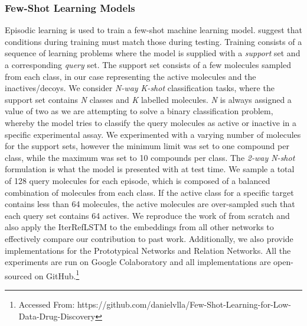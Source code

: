 \subsubsection{Few-Shot Learning Models}

Episodic learning is used to train a few-shot machine learning model. \citet{vinyals2016matching} suggest that conditions during training must match those during testing. Training consists of a sequence of learning problems where the model is supplied with a \textit{support} set and a corresponding \textit{query} set. The support set consists of a few molecules sampled from each class, in our case representing the active molecules and the inactives/decoys. We consider \textit{N-way K-shot} classification tasks, where the support set contains \textit{N} classes and \textit{K} labelled molecules. \textit{N} is always assigned a value of two as we are attempting to solve a binary classification problem, whereby the model tries to classify the query molecules as active or inactive in a specific experimental assay. We experimented with a varying number of molecules for the support sets, however the minimum limit was set to one compound per class, while the maximum was set to 10 compounds per class. The \textit{2-way N-shot} formulation is what the model is presented with at test time. We sample a total of 128 query molecules for each episode, which is composed of a balanced combination of molecules from each class. If the active class for a specific target contains less than 64 molecules, the active molecules are over-sampled such that each query set contains 64 actives. We reproduce the work of \citet{altae2017low} from scratch and also apply the IterRefLSTM to the embeddings from all other networks to effectively compare our contribution to past work. Additionally, we also provide implementations for the Prototypical Networks and Relation Networks. All the experiments are run on Google Colaboratory and all implementations are open-sourced on GitHub.\footnote{Accessed From: https://github.com/danielvlla/Few-Shot-Learning-for-Low-Data-Drug-Discovery}


